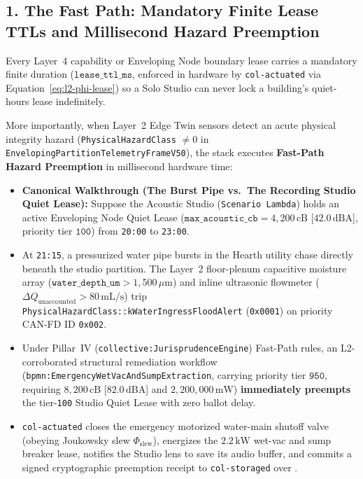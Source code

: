 \subsection{1. The Fast Path: Mandatory Finite Lease TTLs and Millisecond Hazard Preemption}

Every Layer~4 capability or Enveloping Node boundary lease carries a mandatory finite duration ($\mathtt{lease\_ttl\_ms}$, enforced in hardware by \texttt{col-actuated} via Equation~\eqref{eq:l2-phi-lease}) so a Solo Studio can never lock a building's quiet-hours lease indefinitely.

More importantly, when Layer~2 Edge Twin sensors detect an acute physical integrity hazard (\texttt{PhysicalHazardClass} $\ne 0$ in \texttt{EnvelopingPartitionTelemetryFrameV50}), the stack executes \textbf{Fast-Path Hazard Preemption} in millisecond hardware time:
\begin{itemize}
    \item \textbf{Canonical Walkthrough (The Burst Pipe vs.\ The Recording Studio Quiet Lease):} Suppose the Acoustic Studio (\texttt{Scenario Lambda}) holds an active Enveloping Node Quiet Lease ($\mathtt{max\_acoustic\_cb} = 4{,}200\,\mathrm{cB}$ [$42.0\,\mathrm{dBA}$], priority tier $\mathtt{100}$) from \texttt{20:00} to \texttt{23:00}.
    \item At \texttt{21:15}, a pressurized water pipe bursts in the Hearth utility chase directly beneath the studio partition. The Layer~2 floor-plenum capacitive moisture array ($\mathtt{water\_depth\_um} > 1{,}500\,\mu\mathrm{m}$) and inline ultrasonic flowmeter ($\Delta Q_{\mathrm{unaccounted}} > 80\,\mathrm{mL/s}$) trip \texttt{PhysicalHazardClass::kWaterIngressFloodAlert} (\texttt{0x0001}) on priority CAN-FD ID \texttt{0x002}.
    \item Under Pillar~IV (\texttt{collective:JurisprudenceEngine}) Fast-Path rules, an L2-corroborated structural remediation workflow (\texttt{bpmn:EmergencyWetVacAndSumpExtraction}, carrying priority tier $\mathtt{950}$, requiring $8{,}200\,\mathrm{cB}$ [$82.0\,\mathrm{dBA}$] and $2{,}200{,}000\,\mathrm{mW}$) \textbf{immediately preempts} the tier-\texttt{100} Studio Quiet Lease with zero ballot delay.
    \item \texttt{col-actuated} closes the emergency motorized water-main shutoff valve (obeying Joukowsky slew $\Phi_{\mathrm{slew}}$), energizes the $2.2\,\mathrm{kW}$ wet-vac and sump breaker lease, notifies the Studio lens to save its audio buffer, and commits a signed cryptographic preemption receipt to \texttt{col-storaged} over .
\end{itemize}

